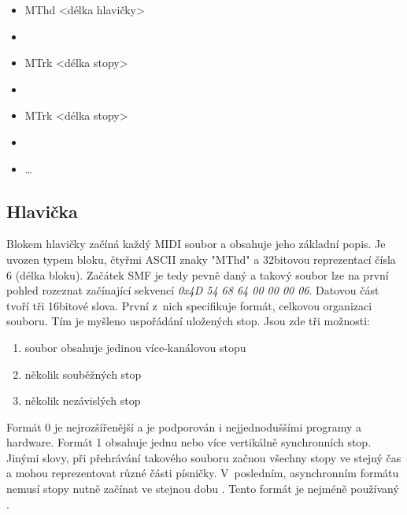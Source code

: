 \begin{itemize} [label={}]
    \item MThd <délka hlavičky>
    \item <data hlavičky>
    \item MTrk <délka stopy>
    \item <data stopy>
    \item MTrk <délka stopy>
    \item <data stopy>
    \item \dots
\end{itemize}

\subsection{Hlavička}
Blokem hlavičky začíná každý MIDI soubor a obsahuje jeho základní popis.
Je uvozen typem bloku, čtyřmi ASCII znaky "MThd" 
a 32bitovou reprezentací čísla 6 (délka bloku). 
Začátek SMF je tedy pevně daný a takový soubor lze na první pohled rozeznat začínající sekvencí 
\emph{0x4D 54 68 64 00 00 00 06}. 
Datovou část tvoří tři 16bitové slova.
První z~nich specifikuje formát, celkovou organizaci souboru.
Tím je myšleno uspořádání uložených stop.
Jsou zde tři možnosti:

\begin{enumerate}\addtocounter{enumi}{-1}
    \item soubor obsahuje jedinou více-kanálovou stopu
    \item několik souběžných stop
    \item několik nezávislých stop
\end{enumerate}

Formát 0 je nejrozšířenější a je podporován i nejjednoduššími programy 
a hardware.
\cite{Back_SMF_Specif}
Formát 1 obsahuje jednu nebo více vertikálně synchronních stop.
Jinými slovy, při přehrávání takového souboru 
začnou všechny stopy ve stejný čas 
a mohou reprezentovat různé části písničky.
V~posledním, asynchronním formátu nemusí stopy nutně začínat ve stejnou dobu
\cite{Neznamy_aboutMIDIFiles}.
Tento formát je nejméně používaný
\cite{MIDI_tutorials}.
\par

